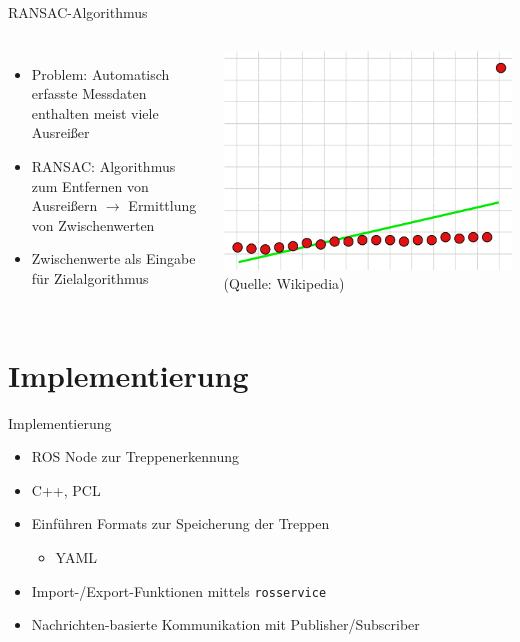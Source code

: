\documentclass[18pt]{beamer}
\begin{document}
\begin{frame}{RANSAC-Algorithmus}
\begin{columns}
	\begin{itemize}
		\item Problem: Automatisch erfasste Messdaten enthalten meist viele Ausreißer
		\item RANSAC: Algorithmus zum Entfernen von Ausreißern \(\longrightarrow\) Ermittlung von Zwischenwerten
		\item Zwischenwerte als Eingabe für Zielalgorithmus
	\end{itemize}
	\includegraphics[scale=0.28]{images/ausreisser.pdf}
	(Quelle: Wikipedia)
\end{columns}
\end{frame}



\section{Implementierung}

\begin{frame}{Implementierung}
\begin{itemize}
	\item ROS Node zur Treppenerkennung
	\item C++, PCL
	\item Einführen Formats zur Speicherung der Treppen
	\begin{itemize}
		\item YAML
	\end{itemize}
	\item Import-/Export-Funktionen mittels \texttt{rosservice}
	\item Nachrichten-basierte Kommunikation mit Publisher/Subscriber
\end{itemize}
\end{frame}
\end{document}
